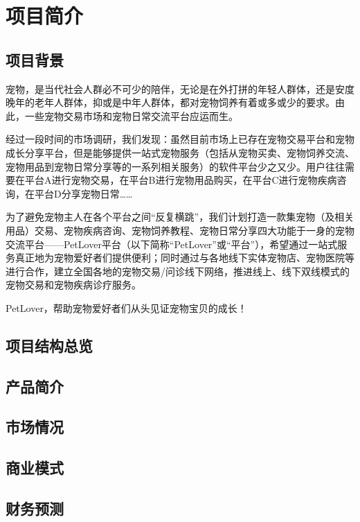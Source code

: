 \documentclass[a4paper]{ctexart}
\begin{document}
\section{项目简介}

\subsection{项目背景}
宠物，是当代社会人群必不可少的陪伴，无论是在外打拼的年轻人群体，还是安度晚年的老年人群体，抑或是中年人群体，都对宠物饲养有着或多或少的要求。由此，一些宠物交易市场和宠物日常交流平台应运而生。

经过一段时间的市场调研，我们发现：虽然目前市场上已存在宠物交易平台和宠物成长分享平台，但是能够提供一站式宠物服务（包括从宠物买卖、宠物饲养交流、宠物用品到宠物日常分享等的一系列相关服务）的软件平台少之又少。用户往往需要在平台A进行宠物交易，在平台B进行宠物用品购买，在平台C进行宠物疾病咨询，在平台D分享宠物日常……

为了避免宠物主人在各个平台之间“反复横跳”，我们计划打造一款集宠物（及相关用品）交易、宠物疾病咨询、宠物饲养教程、宠物日常分享四大功能于一身的宠物交流平台——PetLover平台（以下简称“PetLover”或“平台”），希望通过一站式服务真正地为宠物爱好者们提供便利；同时通过与各地线下实体宠物店、宠物医院等进行合作，建立全国各地的宠物交易/问诊线下网络，推进线上、线下双线模式的宠物交易和宠物疾病诊疗服务。

PetLover，帮助宠物爱好者们从头见证宠物宝贝的成长！

\subsection{项目结构总览}

\subsection{产品简介}

\subsection{市场情况}

\subsection{商业模式}

\subsection{财务预测}
\end{document}
